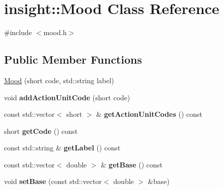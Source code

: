 \hypertarget{classinsight_1_1Mood}{}\section{insight\+:\+:Mood Class Reference}
\label{classinsight_1_1Mood}


{\ttfamily \#include $<$mood.\+h$>$}

\subsection*{Public Member Functions}
\begin{DoxyCompactItemize}
\item 
\hyperlink{classinsight_1_1Mood_a57a906b2fcc580d0caf0d0eafa44d7e8}{Mood} (short code, std\+::string label)
\item 
void {\bfseries add\+Action\+Unit\+Code} (short code)\hypertarget{classinsight_1_1Mood_ac7475968ae155bea842aace3c6de5162}{}\label{classinsight_1_1Mood_ac7475968ae155bea842aace3c6de5162}

\item 
const std\+::vector$<$ short $>$ \& {\bfseries get\+Action\+Unit\+Codes} () const \hypertarget{classinsight_1_1Mood_ac1f9466cecc9e59591a4d5841050a092}{}\label{classinsight_1_1Mood_ac1f9466cecc9e59591a4d5841050a092}

\item 
short {\bfseries get\+Code} () const \hypertarget{classinsight_1_1Mood_ad0d7c3075f350ca4a35a5708aed6b0a2}{}\label{classinsight_1_1Mood_ad0d7c3075f350ca4a35a5708aed6b0a2}

\item 
const std\+::string \& {\bfseries get\+Label} () const \hypertarget{classinsight_1_1Mood_ae66b1b7f29f9cd6c886a6434edaf9b39}{}\label{classinsight_1_1Mood_ae66b1b7f29f9cd6c886a6434edaf9b39}

\item 
const std\+::vector$<$ double $>$ \& {\bfseries get\+Base} () const \hypertarget{classinsight_1_1Mood_a6fde719a817dfbdbd4687e9cb7b7bcef}{}\label{classinsight_1_1Mood_a6fde719a817dfbdbd4687e9cb7b7bcef}

\item 
void {\bfseries set\+Base} (const std\+::vector$<$ double $>$ \&base)\hypertarget{classinsight_1_1Mood_ae2301ec46be78fa4fb31778bd5376bbd}{}\label{classinsight_1_1Mood_ae2301ec46be78fa4fb31778bd5376bbd}

\end{DoxyCompactItemize}


